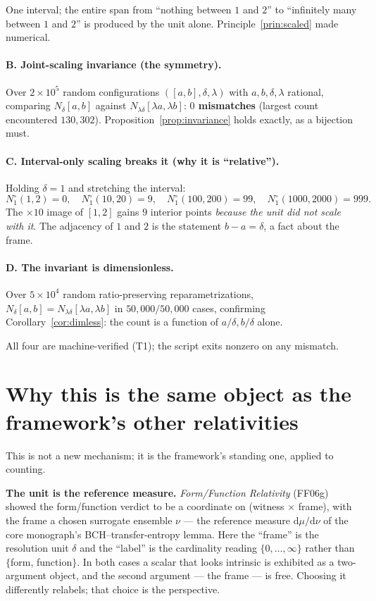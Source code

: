 \documentclass[11pt]{article}
\theoremstyle{definition}
\theoremstyle{plain}
\begin{document}
\noindent One interval; the entire span from ``nothing between $1$ and $2$'' to ``infinitely many
between $1$ and $2$'' is produced by the unit alone. Principle~\ref{prin:scaled} made numerical.

\paragraph{B. Joint-scaling invariance (the symmetry).} Over $2\times10^{5}$ random configurations
$([a,b],\delta,\lambda)$ with $a,b,\delta,\lambda$ rational, comparing $N_\delta[a,b]$ against
$N_{\lambda\delta}[\lambda a,\lambda b]$: \textbf{$0$ mismatches} (largest count encountered $130{,}302$).
Proposition~\ref{prop:invariance} holds exactly, as a bijection must.

\paragraph{C. Interval-only scaling breaks it (why it is ``relative'').} Holding $\delta=1$ and
stretching the interval:
\[
  N_1^{\circ}(1,2)=0,\quad N_1^{\circ}(10,20)=9,\quad N_1^{\circ}(100,200)=99,\quad N_1^{\circ}(1000,2000)=999.
\]
The $\times 10$ image of $[1,2]$ gains $9$ interior points \emph{because the unit did not scale with
it}. The adjacency of $1$ and $2$ is the statement $b-a=\delta$, a fact about the frame.

\paragraph{D. The invariant is dimensionless.} Over $5\times10^{4}$ random ratio-preserving
reparametrizations, $N_\delta[a,b]=N_{\lambda\delta}[\lambda a,\lambda b]$ in \textbf{$50{,}000/50{,}000$}
cases, confirming Corollary~\ref{cor:dimless}: the count is a function of $a/\delta,b/\delta$ alone.

All four are machine-verified (T1); the script exits nonzero on any mismatch.

\section{Why this is the same object as the framework's other relativities}\label{sec:same}

This is not a new mechanism; it is the framework's standing one, applied to counting.

\textbf{The unit is the reference measure.} \textit{Form/Function Relativity} (FF06g) showed the
form/function verdict to be a coordinate on (witness $\times$ frame), with the frame a chosen surrogate
ensemble $\nu$ --- the reference measure $\mathrm{d}\mu/\mathrm{d}\nu$ of the core monograph's
BCH--transfer-entropy lemma. Here the ``frame'' is the resolution unit $\delta$ and the ``label'' is
the cardinality reading $\{0,\dots,\infty\}$ rather than $\{$form, function$\}$. In both cases a scalar
that looks intrinsic is exhibited as a two-argument object, and the second argument --- the frame --- is
free. Choosing it differently relabels; that choice is the perspective.
\end{document}
